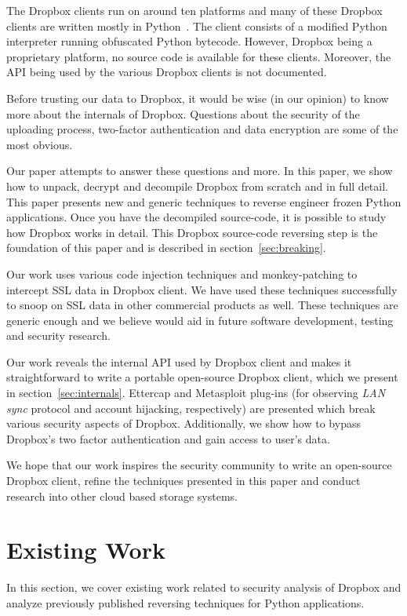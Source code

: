 \documentclass[letterpaper,twocolumn,10pt]{article}
\begin{document}
The Dropbox clients run on around ten platforms and many of these Dropbox
clients are written mostly in Python~\cite{DropboxPyCon11}. The client consists
of a modified Python interpreter running obfuscated Python bytecode. However,
Dropbox being a proprietary platform, no source code is available for these
clients. Moreover, the API being used by the various Dropbox clients is not
documented.

Before trusting our data to Dropbox, it would be wise (in our opinion) to know
more about the internals of Dropbox. Questions about the security of the
uploading process, two-factor authentication and data encryption are some of
the most obvious.

Our paper attempts to answer these questions and more. In this paper, we show
how to unpack, decrypt and decompile Dropbox from scratch and in full detail.
This paper presents new and generic techniques to reverse engineer frozen Python
applications. Once you have the decompiled source-code, it is possible to study
how Dropbox works in detail. This Dropbox source-code reversing step is the
foundation of this paper and is described in section~\ref{sec:breaking}.

Our work uses various code injection techniques and monkey-patching to
intercept SSL data in Dropbox client. We have used these techniques
successfully to snoop on SSL data in other commercial products as well. These
techniques are generic enough and we believe would aid in future software
development, testing and security research.

Our work reveals the internal API used by Dropbox client and makes it
straightforward to write a portable open-source Dropbox client, which we
present in section~\ref{sec:internals}. Ettercap and Metasploit plug-ins (for
observing \emph{LAN sync} protocol and account hijacking, respectively) are
presented which break various security aspects of Dropbox. Additionally, we
show how to bypass Dropbox's two factor authentication and gain access to
user's data.

We hope that our work inspires the security community to write an open-source
Dropbox client, refine the techniques presented in this paper and conduct
research into other cloud based storage systems.

\section{Existing Work}

In this section, we cover existing work related to security analysis of Dropbox
and analyze previously published reversing techniques for Python applications.
\end{document}
